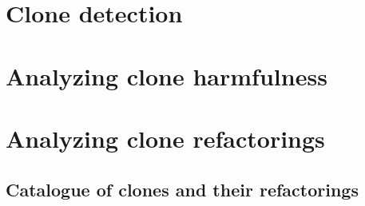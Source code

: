 \documentclass{report}
\theoremstyle{definition}
\theoremstyle{remark}
\begin{document}
\chapter{Clone detection}

\chapter{Analyzing clone harmfulness}


\chapter{Analyzing clone refactorings}


\section{Catalogue of clones and their refactorings}



\newpage


\end{document}
